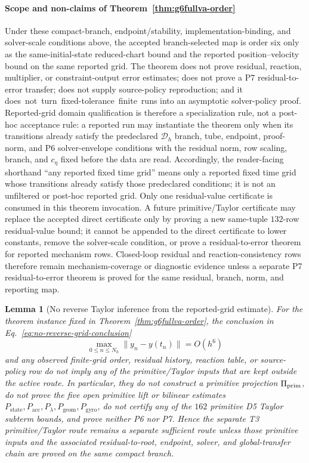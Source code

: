 \documentclass[preprint,12pt]{elsarticle}
\newtheorem{lemma}{Lemma}
\begin{document}
\paragraph{Scope and non-claims of Theorem~\ref{thm:g6fullva-order}}
Under these compact-branch, endpoint/stability, implementation-binding, and
solver-scale conditions above, the accepted branch-selected map is order six
only as the same-initial-state reduced-chart bound and the reported
position--velocity bound on the same reported grid.  The theorem does not prove residual, reaction,
multiplier, or constraint-output error estimates; does not prove a P7
residual-to-error transfer; does not supply source-policy reproduction; and
it \mbox{does not turn fixed-tolerance finite runs} into an asymptotic
solver-policy proof.  Reported-grid domain qualification is therefore a specialization
rule, not a post-hoc acceptance rule: a reported run may instantiate the
theorem only when its transitions already satisfy the predeclared
\(\mathcal D_h\) branch, tube, endpoint, proof-norm, and P6 solver-envelope
conditions with the residual norm, row scaling, branch, and \(c_\eta\) fixed
before the data are read.
Accordingly, the reader-facing shorthand ``any reported fixed time
grid'' means only a reported fixed time grid whose transitions already satisfy
those predeclared conditions; it is not an unfiltered or post-hoc reported
grid.
Only one residual-value certificate is consumed in this theorem invocation.
A future primitive/Taylor certificate may replace the accepted direct
certificate only by proving a new same-tuple \(132\)-row residual-value bound;
it cannot be appended to the direct certificate to lower constants, remove
the solver-scale condition, or prove a residual-to-error theorem for reported
mechanism rows.
Closed-loop residual and reaction-consistency rows therefore remain
mechanism-coverage or diagnostic evidence unless a separate P7
residual-to-error theorem is proved for the same residual, branch, norm, and
reporting map.

\begin{lemma}[No reverse Taylor inference from the reported-grid estimate]
\label{lem:no-reverse-taylor-inference}
For the theorem instance fixed in Theorem~\ref{thm:g6fullva-order}, the
conclusion in Eq.~\eqref{eq:no-reverse-grid-conclusion}
\begin{equation}
\label{eq:no-reverse-grid-conclusion}
  \max_{0\le n\le N_h}\|y_n-y(t_n)\|=O(h^6)
\end{equation}
and any observed finite-grid order, residual history, reaction table, or
source-policy row do not imply any of the primitive/Taylor inputs that are
kept outside the active route.  In particular, they do not construct a
primitive projection \(\Pi_{\rm prim}\), do not prove the five open primitive
lift or bilinear estimates
\(P_{\mathrm{state}},P_{\mathrm{acc}},P_{\lambda},
P_{\mathrm{geom}},P_{\mathrm{gyro}}\), do not certify any of the \(162\)
primitive D5 Taylor subterm bounds, and prove neither P6 nor P7.  Hence the
separate T3 primitive/Taylor route remains a separate sufficient route
unless those primitive inputs and the associated residual-to-root, endpoint,
solver, and global-transfer chain are proved on the same compact branch.
\end{lemma}
\end{document}
